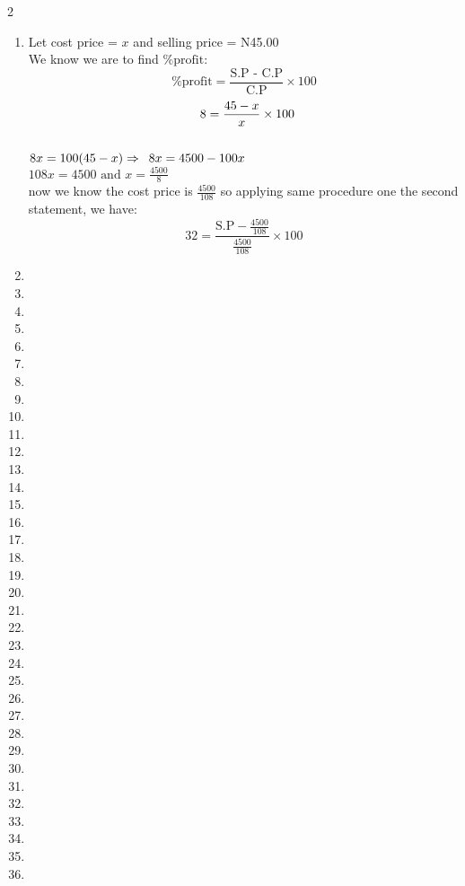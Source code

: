\begin {multicols}{2}
\begin{enumerate}[label={\arabic*.}]
    \item Let cost price = \(x\) and selling price = N45.00 \\
    We know we are to find \(\%\text{profit}\): 
    \[\%\text{profit} = \frac{ \text{S.P - C.P}}{\text{C.P}} \times 100\]
    \[ \hspace{5px} 8 = \frac{45 - x}{x} \times 100 \]\\
    \( 8x = 100(45 -x) \Rightarrow \hspace{5px} 8x = 4500 - 100x\)\\
    \(108x = 4500 \text{ and }  x = \frac{4500}{8}\)\\
    now we know the cost price is \(\frac{4500}{108}\) so applying same procedure
    one the second statement, we have: 
    \[32 = \frac{\text{S.P} - \frac{4500}{108}}{\frac{4500}{108}} \times 100\]
    \item
    \item 
    \item 
    \item 
    \item 
    \item
    \item
    \item
    \item 
    \item
    \item
    \item 
    \item 
    \item 
    \item 
    \item
    \item
    \item
    \item 
    \item
    \item
    \item 
    \item 
    \item 
    \item 
    \item
    \item
    \item
    \item 
    \item
    \item
    \item 
    \item 
    \item 
    \item 

\end{enumerate}
\end{multicols}
